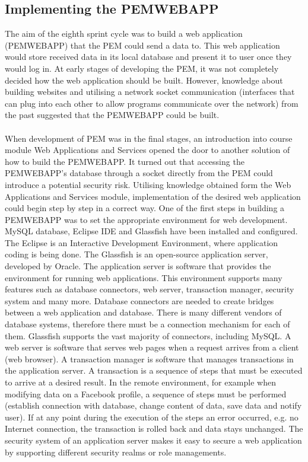 \documentclass[12pt, a4paper]{report}   %
\begin{document}
\begin{enumerate}
\section{Implementing the PEMWEBAPP}
The aim of the eighth sprint cycle was to build a web application (PEMWEBAPP) that the PEM could send a data to. This web application would store received data in its local database and present it to user once they would log in. At early stages of developing the PEM, it was not completely decided how the web application should be built. However, knowledge about building websites and utilising a network socket communication (interfaces that can plug into each other to allow programs communicate over the network) from the past suggested that the PEMWEBAPP could be built.\\ \\
When development of PEM was in the final stages, an introduction into course module Web Applications and Services opened the door to another solution of how to build the PEMWEBAPP. It turned out that accessing the PEMWEBAPP's database through a socket directly from the PEM could introduce a potential security risk. Utilising knowledge obtained form the Web Applications and Services module, implementation of the desired web application could begin step by step in a correct way.
One of the first steps in building a PEMWEBAPP was to set the appropriate environment for web development. MySQL database, Eclipse IDE and Glassfish have been installed and configured. The Eclipse is an Interactive Development Environment, where application coding is being done. The Glassfish is an open-source application server, developed by Oracle. The application server is software that provides the environment for running web applications. This environment supports many features such as database connectors, web server, transaction manager, security system and many more. Database connectors are needed to create bridges between a web application and database. There is many different vendors of database systems, therefore there must be a connection mechanism for each of them.  Glassfish supports the vast majority of connectors, including MySQL. A web server is software that serves web pages when a request arrives from a client (web browser).  A transaction manager is software that manages transactions in the application server. A transaction is a sequence of steps that must be executed to arrive at a desired result. In the remote environment, for example when modifying data on a Facebook profile, a sequence of steps must be performed (establish connection with database, change content of data, save data and notify user).  If at any point during the execution of the steps an error occurred, e.g. no Internet connection, the transaction is rolled back and data stays unchanged. The security system of an application server makes it easy to secure a web application by supporting different security realms or role managements.\\ \\

\end{enumerate}
\end{document}
